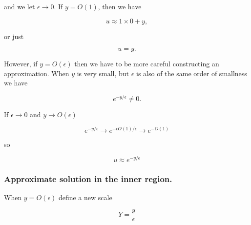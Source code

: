 and we let $\epsilon \rightarrow 0$.  If $y = O(1)$, then we have

\begin{equation}\label{eqn:continuumL20:470}
u \approx 1 \times 0 + y,
\end{equation}

or just

\begin{equation}\label{eqn:continuumL20:490}
u = y.
\end{equation}

However, if $y = O(\epsilon)$ then we have to be more careful constructing an approximation.  When $y$ is very small, but $\epsilon$ is also of the same order of smallness we have

%
%
%
%
%
\begin{equation}\label{eqn:continuumL20:130}
e^{-y/\epsilon} \ne 0.
\end{equation}

If $\epsilon \rightarrow 0$ and $y \rightarrow O(\epsilon)$

\begin{equation}\label{eqn:continuumL20:150}
e^{-y/\epsilon} \rightarrow e^{-\epsilon O(1) /\epsilon} \rightarrow e^{-O(1)}
\end{equation}

so

\begin{equation}\label{eqn:continuumL20:170}
u \approx e^{-y/\epsilon}
\end{equation}


\subsubsection{Approximate solution in the inner region.}

When $y = O(\epsilon)$ define a new scale

\begin{equation}\label{eqn:continuumL20:190}
Y = \frac{y}{\epsilon}
\end{equation}

